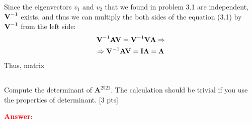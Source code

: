 \documentclass{homework}
\begin{document}
	Since the eigenvectors $v_1$ and $v_2$ that we found in problem 3.1 are independent, $\text{\textbf{V}}^{-1}$ exists, and thus we can multiply the both sides of the equation (3.1) by $\text{\textbf{V}}^{-1}$ from the left side:
	\begin{equation}
	    \begin{gathered}
	    \text{\textbf{V}}^{-1}\text{\textbf{AV}} = \text{\textbf{V}}^{-1}\text{\textbf{V}}\mathbf{\Lambda} \Rightarrow \\
	    \Rightarrow 
	    \text{\textbf{V}}^{-1}\text{\textbf{AV}} = \text{\textbf{I}}\mathbf{\Lambda} = \mathbf{\Lambda}
	    \end{gathered}
	\end{equation}
	   Thus, matrix 
	

	\subsection{}
	Compute the determinant of $\textbf{A}^{2521}$. The calculation should be trivial if you use the properties of determinant. [3 pts]
	
	\textbf{\textcolor{red}{Answer}}: \\
	
\end{document}
